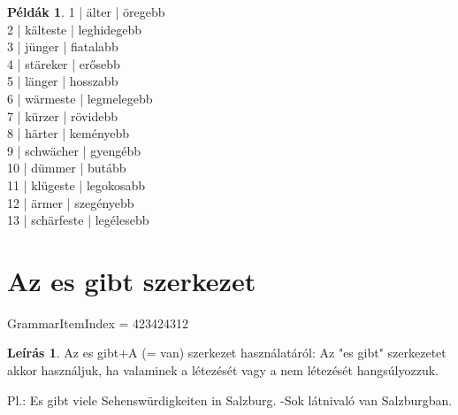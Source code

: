 \documentclass{article}
\theoremstyle{definition}
\newtheorem*{exmp}{Példák}
\newtheorem*{desc}{Leírás}
\begin{document}
\begin{exmp}
1 | älter | öregebb\\
2 | kälteste | leghidegebb\\
3 | jünger | fiatalabb\\
4 | stäreker | erősebb\\
5 | länger | hosszabb\\
6 | wärmeste | legmelegebb\\
7 | kürzer | rövidebb\\
8 | härter | keményebb\\
9 | schwächer | gyengébb\\
10 | dümmer | butább\\
11 | klügeste | legokosabb\\
12 | ärmer | szegényebb\\
13 | schärfeste | legélesebb\\
\end{exmp}

\section{Az es gibt szerkezet}

GrammarItemIndex = 423424312

\begin{desc}
Az es gibt+A (= van) szerkezet használatáról: Az "es gibt" szerkezetet akkor használjuk, ha valaminek a létezését vagy a nem létezését hangsúlyozzuk.

Pl.: Es gibt viele Sehenswürdigkeiten in Salzburg. -Sok látnivaló van Salzburgban.
\end{desc}
\end{document}
